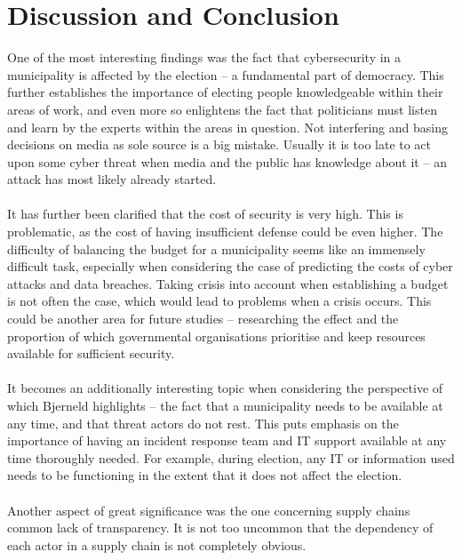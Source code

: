 \documentclass{article}
\begin{document}
\section{Discussion and Conclusion}
One of the most interesting findings was the fact that cybersecurity in a municipality is affected by the election -- a fundamental part of democracy.
This further establishes the importance of electing people knowledgeable within their areas of work, and even more so enlightens the fact that politicians must listen and learn by the experts within the areas in question.
Not interfering and basing decisions on media as sole source is a big mistake.
Usually it is too late to act upon some cyber threat when media and the public has knowledge about it -- an attack has most likely already started.
\\
\\
It has further been clarified that the cost of security is very high.
This is problematic, as the cost of having insufficient defense could be even higher.
The difficulty of balancing the budget for a municipality seems like an immensely difficult task, especially when considering the case of predicting the costs of cyber attacks and data breaches.
Taking crisis into account when establishing a budget is not often the case, which would lead to problems when a crisis occurs.
This could be another area for future studies -- researching the effect and the proportion of which governmental organisations prioritise and keep resources available for sufficient security.
\\
\\
It becomes an additionally interesting topic when considering the perspective of which Bjerneld highlights -- the fact that a municipality needs to be available at any time, and that threat actors do not rest.
This puts emphasis on the importance of having an incident response team and IT support available at any time thoroughly needed.
For example, during election, any IT or information used needs to be functioning in the extent that it does not affect the election.
\\
\\
Another aspect of great significance was the one concerning supply chains common lack of transparency.
It is not too uncommon that the dependency of each actor in a supply chain is not completely obvious.
\end{document}
